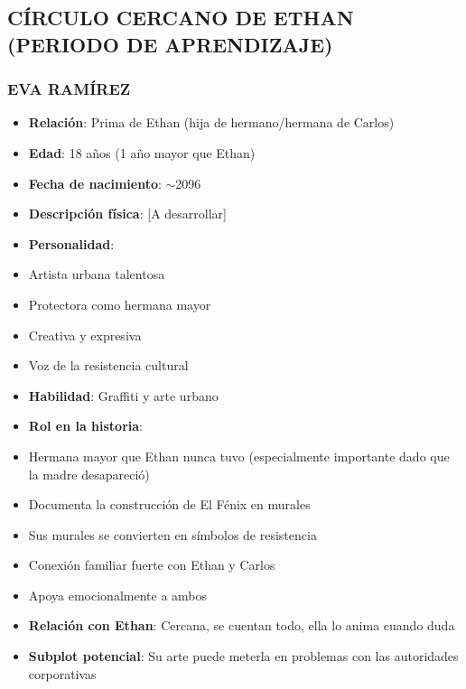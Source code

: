 \documentclass[11pt,a4paper]{report}
\begin{document}
\subsection{CÍRCULO CERCANO DE ETHAN (PERIODO DE APRENDIZAJE)}

\subsubsection{EVA RAMÍREZ}
\begin{itemize}
  \item \textbf{Relación}: Prima de Ethan (hija de hermano/hermana de Carlos)
  \item \textbf{Edad}: 18 años (1 año mayor que Ethan)
  \item \textbf{Fecha de nacimiento}: $\sim$2096
  \item \textbf{Descripción física}: [A desarrollar]
  \item \textbf{Personalidad}: 
  \item Artista urbana talentosa
  \item Protectora como hermana mayor
  \item Creativa y expresiva
  \item Voz de la resistencia cultural
  \item \textbf{Habilidad}: Graffiti y arte urbano
  \item \textbf{Rol en la historia}: 
  \item Hermana mayor que Ethan nunca tuvo (especialmente importante dado que la madre desapareció)
  \item Documenta la construcción de El Fénix en murales
  \item Sus murales se convierten en símbolos de resistencia
  \item Conexión familiar fuerte con Ethan y Carlos
  \item Apoya emocionalmente a ambos
  \item \textbf{Relación con Ethan}: Cercana, se cuentan todo, ella lo anima cuando duda
  \item \textbf{Subplot potencial}: Su arte puede meterla en problemas con las autoridades corporativas

\end{itemize}
\end{document}

